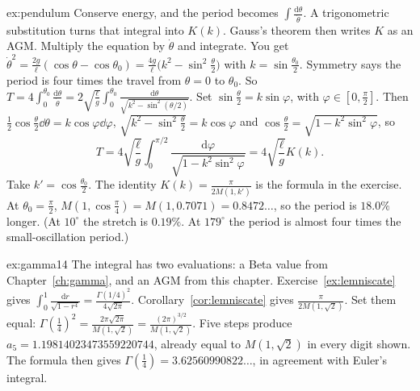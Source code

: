 \begin{solution}{ex:pendulum}
\idea Conserve energy, and the period becomes $\int\frac{\mathrm d\theta}{\dot\theta}$. A trigonometric substitution turns that integral into $K(k)$. Gauss's theorem
then writes $K$ as an AGM.
\writeup Multiply the equation by $\dot\theta$ and integrate. You get $\dot\theta^2=\frac{2g}\ell(\cos\theta-\cos\theta_0)=\frac{4g}\ell\bigl(k^2-\sin^2\frac\theta2\bigr)$ with $k=\sin\frac{\theta_0}2$.
Symmetry says the period is four times the travel from $\theta=0$ to $\theta_0$. So $T=4\int_0^{\theta_0}\frac{\mathrm d\theta}{\dot\theta}=2\sqrt{\frac\ell g}\int_0^{\theta_0}\frac{\mathrm d\theta}{\sqrt{k^2-\sin^2(\theta/2)}}$.
Set $\sin\frac\theta2=k\sin\varphi$, with $\varphi\in[0,\frac\pi2]$. Then $\frac12\cos\frac\theta2\dd\theta=k\cos\varphi\dd\varphi$, $\sqrt{k^2-\sin^2\frac\theta2}=k\cos\varphi$ and
$\cos\frac\theta2=\sqrt{1-k^2\sin^2\varphi}$, so
\[
T=4\sqrt{\frac\ell g}\int_0^{\pi/2}\frac{\mathrm d\varphi}{\sqrt{1-k^2\sin^2\varphi}}=4\sqrt{\frac\ell g}K(k).
\]
Take $k'=\cos\frac{\theta_0}2$. The identity $K(k)=\frac\pi{2M(1,k')}$ is the formula in the exercise. At $\theta_0=\frac\pi2$, $M(1,\cos\frac\pi4)=M(1,0.7071)=0.8472\ldots$, so the period is $18.0\%$ longer.
(At $10^\circ$ the stretch is $0.19\%$. At $179^\circ$ the period is almost four times the small-oscillation period.)
\end{solution}

\begin{solution}{ex:gamma14}
\idea The integral has two evaluations: a Beta value from Chapter~\ref{ch:gamma}, and an AGM from this chapter.
\writeup Exercise~\ref{ex:lemniscate} gives $\int_0^1\frac{\mathrm dr}{\sqrt{1-r^4}}=\frac{\Gamma(1/4)^2}{4\sqrt{2\pi}}$. Corollary~\ref{cor:lemniscate} gives $\frac\pi{2M(1,\sqrt2)}$. Set them equal:
$\Gamma(\frac14)^2=\frac{2\pi\sqrt{2\pi}}{M(1,\sqrt2)}=\frac{(2\pi)^{3/2}}{M(1,\sqrt2)}$. Five steps produce $a_5=1.19814023473559220744$, already equal to $M(1,\sqrt2)$ in every digit shown. The formula then gives
$\Gamma(\frac14)=3.62560990822\ldots$, in agreement with Euler's integral.
\end{solution}

